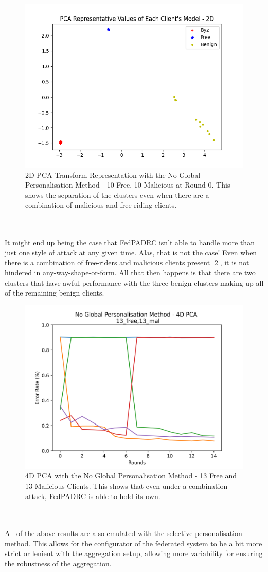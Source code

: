 \begin{figure}[htbp]
	\centering
    \includegraphics[scale=0.5]{my_agg/graphs/10mal_10free_r0_no_global.png}
    \caption{2D PCA Transform Representation with the No Global Personalisation Method - 10 Free, 10 Malicious at Round 0. This shows the separation of the clusters even when there are a combination of malicious and free-riding clients.}
	\label{fig:10mal10free_rep}
\end{figure}
\\ \\
It might end up being the case that FedPADRC isn't able to handle more than just one style of attack at any given time.
Alas, that is not the case!
Even when there is a combination of free-riders and malicious clients present [\ref{fig:no_13free_13mal}], it is not hindered in any-way-shape-or-form.
All that then happens is that there are two clusters that have awful performance with the three benign clusters making up all of the remaining benign clients.
\begin{figure}[htbp]
	\centering
    \includegraphics[scale=0.5]{my_agg/graphs/no_global_13free_13mal.png}
    \caption{4D PCA with the No Global Personalisation Method - 13 Free and 13 Malicious Clients. This shows that even under a combination attack, FedPADRC is able to hold its own.}
	\label{fig:no_13free_13mal}
\end{figure}
\\ \\
All of the above results are also emulated with the selective personalisation method.
This allows for the configurator of the federated system to be a bit more strict or lenient with the aggregation setup, allowing more variability for ensuring the robustness of the aggregation.

